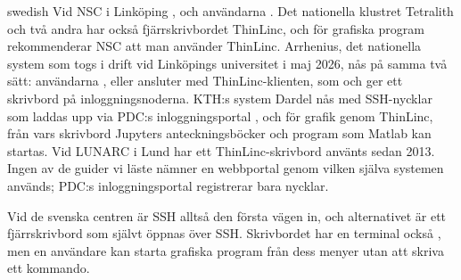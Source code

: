 \begin{onlyin}{swedish}
Vid NSC i Linköping
, och användarna
.  Det nationella klustret Tetralith och två andra har
också fjärrskrivbordet ThinLinc, och för grafiska program
rekommenderar NSC att man använder ThinLinc\autocite{NSCGraphics2026}.
Arrhenius, det nationella system som togs i drift vid
Linköpings universitet i maj 2026\autocite{NAISSArrhenius2026}, nås på
samma två sätt: användarna
, eller ansluter
med ThinLinc-klienten\autocite{NAISSArrheniusQuickstart2026}, som
 och ger ett skrivbord på
inloggningsnoderna.  KTH:s system Dardel nås med SSH-nycklar som laddas
upp via PDC:s inloggningsportal%
\autocite{PDCSSHLogin2026,NAISSDardelQuickstart2026}, och för grafik
genom ThinLinc, från vars skrivbord Jupyters anteckningsböcker och
program som
Matlab kan startas\autocite{PDCInteractive2026}.  Vid LUNARC i Lund har
ett ThinLinc-skrivbord använts sedan 2013\autocite{Lindemann2024LUNARC}.
Ingen av de guider vi läste nämner en webbportal genom vilken själva
systemen används; PDC:s inloggningsportal registrerar bara nycklar.

Vid de svenska centren är SSH alltså den första vägen in, och
alternativet är ett fjärrskrivbord som självt öppnas över SSH.
Skrivbordet har en terminal också%
\autocite{NAISSArrheniusThinLinc2026,PDCInteractive2026}, men en
användare kan starta grafiska program från dess menyer utan att skriva
ett kommando.
\end{onlyin}

